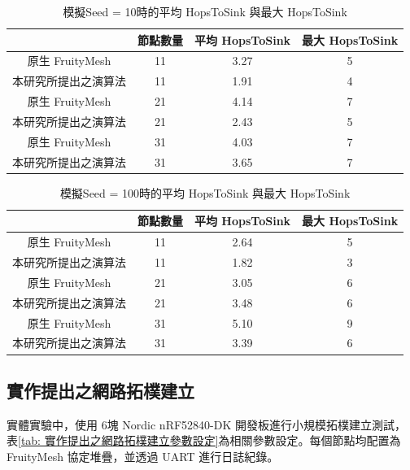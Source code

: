 \begin{ZhChapter}
\begin{table}[H]
    \centering
    \caption{模擬Seed = 10時的平均 HopsToSink 與最大 HopsToSink}
    \label{tab: Seed = 10時的平均 HopsToSink 與最大 HopsToSink}
    \begin{tabular}{|c|c|c|c|}
        \hline
          &節點數量 & 平均 HopsToSink & 最大 HopsToSink \\
        \hline
        原生 FruityMesh & 11 & 3.27 & 5 \\
        \hline
        本研究所提出之演算法 & 11 & 1.91 & 4 \\
        \hline
        原生 FruityMesh & 21 & 4.14 & 7 \\
        \hline
        本研究所提出之演算法 & 21 & 2.43 & 5 \\
        \hline
        原生 FruityMesh & 31 & 4.03 & 7 \\
        \hline
        本研究所提出之演算法 & 31 & 3.65 & 7 \\
        \hline
    \end{tabular}
\end{table}

\begin{table}[H]
    \centering
    \caption{模擬Seed = 100時的平均 HopsToSink 與最大 HopsToSink}
    \label{tab: Seed = 100時的平均 HopsToSink 與最大 HopsToSink}
    \begin{tabular}{|c|c|c|c|}
        \hline
          &節點數量 & 平均 HopsToSink & 最大 HopsToSink \\
        \hline
        原生 FruityMesh & 11 & 2.64 & 5 \\
        \hline
        本研究所提出之演算法 & 11 & 1.82 & 3 \\
        \hline
        原生 FruityMesh & 21 & 3.05 & 6 \\
        \hline
        本研究所提出之演算法 & 21 & 3.48 & 6 \\
        \hline
        原生 FruityMesh & 31 & 5.10 & 9 \\
        \hline
        本研究所提出之演算法 & 31 & 3.39 & 6 \\
        \hline
    \end{tabular}
\end{table}

\subsection{實作提出之網路拓樸建立}
實體實驗中，使用 6塊 Nordic nRF52840-DK 開發板進行小規模拓樸建立測試，表\ref{tab: 實作提出之網路拓樸建立參數設定}為相關參數設定。每個節點均配置為 FruityMesh 協定堆疊，並透過 UART 進行日誌紀錄。


\end{ZhChapter}
